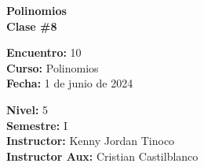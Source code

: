\begin{center} \textbf
{
    \Large Polinomios \\ \vspace{2mm}Clase \#8
}
\end{center}

\begin{multicols}{2}
{
    \textbf{Encuentro:} 10\\
    \textbf{Curso:} Polinomios\\
    \textbf{Fecha:} 1 de junio de 2024\\
    \begin{flushright}
        \textbf{Nivel:} 5\\
        \textbf{Semestre:} I\\
        \textbf{Instructor:} Kenny Jordan Tinoco\\
        \textbf{Instructor Aux:} Cristian Castilblanco
    \end{flushright}
}
\end{multicols}

\thispagestyle{first-page-style}